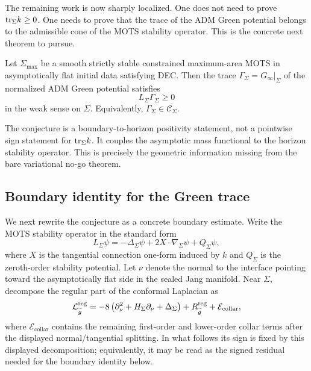 The remaining work is now sharply localized. One does not need to prove \(\mathrm{tr}_\Sigma k\ge0\). One needs to prove that the trace of the ADM Green potential belongs to the admissible cone of the MOTS stability operator. This is the concrete next theorem to pursue.

\begin{conjecture}\label{conj:GreenTraceCalibration}
Let \(\Sigma_{\max}\) be a smooth strictly stable constrained maximum-area MOTS in asymptotically flat initial data satisfying DEC. Then the trace \(\Gamma_\Sigma=G_\infty|_\Sigma\) of the normalized ADM Green potential satisfies
\[
    L_\Sigma\Gamma_\Sigma\ge0
\]
in the weak sense on \(\Sigma\). Equivalently, \(\Gamma_\Sigma\in\overline{\mathcal C_\Sigma}\).
\end{conjecture}

\begin{remark}
The conjecture is a boundary-to-horizon positivity statement, not a pointwise sign statement for \(\mathrm{tr}_\Sigma k\). It couples the asymptotic mass functional to the horizon stability operator. This is precisely the geometric information missing from the bare variational no-go theorem.
\end{remark}

\subsection{Boundary identity for the Green trace}

We next rewrite the conjecture as a concrete boundary estimate. Write the MOTS stability operator in the standard form
\begin{equation}\label{eq:MOTSStabilityGeneral37}
    L_\Sigma \psi
    =
    -\Delta_\Sigma\psi+2X\cdot\nabla_\Sigma\psi+Q_\Sigma\psi,
\end{equation}
where \(X\) is the tangential connection one-form induced by \(k\) and \(Q_\Sigma\) is the zeroth-order stability potential. Let \(\nu\) denote the normal to the interface pointing toward the asymptotically flat side in the sealed Jang manifold. Near \(\Sigma\), decompose the regular part of the conformal Laplacian as
\[
    \mathcal L_{\widetilde{g}}^{\mathrm{reg}}
    =
    -8\left(\partial_\nu^2+H_\Sigma\partial_\nu+\Delta_\Sigma\right)
    +R_{\widetilde{g}}^{\mathrm{reg}}
    +\mathcal E_{\mathrm{collar}},
\]
where \(\mathcal E_{\mathrm{collar}}\) contains the remaining first-order and lower-order collar terms after the displayed normal/tangential splitting. In what follows its sign is fixed by this displayed decomposition; equivalently, it may be read as the signed residual needed for the boundary identity below.

